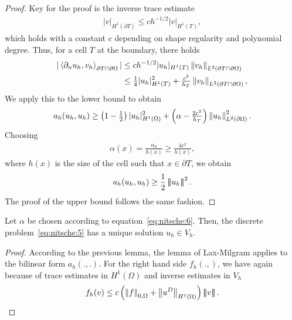 \begin{proof}
  Key for the proof is the inverse trace estimate
  \begin{gather*}
    |v|_{H^1(\partial T)} \le c h^{-1/2} |v|_{H^1(T)},
  \end{gather*}
  which holds with a constant $c$ depending on shape regularity and
  polynomial degree. Thus, for a cell $T$ at the boundary, there holds
  \begin{align*}
    |\forme(\partial_n u_h, v_h)_{\partial T \cap \partial\Omega}|
    & \le c h^{-1/2} |u_h|_{H^1(T)} \norm{v_h}_{L^2(\partial T \cap \partial\Omega)}
    \\
    &\le \tfrac{1}{4} |u_h|_{H^1(T)}^2
    + \tfrac{c^2}{h_T}\norm{v_h}_{L^2(\partial T \cap \partial\Omega)},
  \end{align*}
  We apply this to the lower bound to obtain
  \begin{gather*}
    a_h(u_h, u_h) \ge \left(1-\tfrac{1}{2}\right)
    |u_h|_{H^1(\Omega)}^2
    + \left(\alpha - \tfrac{2c^2}{h_T}\right)
    \left\|u_h\right\|_{L^2(\partial\Omega)}^2.
  \end{gather*}
  Choosing
  \begin{gather}
    \label{eq:nitsche:6}
    \alpha(x) = \frac{\alpha_0}{h(x)} \ge \frac{4c^2}{h(x)}, 
  \end{gather}
  where $h(x)$ is the size of the
  cell such that $x\in\partial T$, we obtain
  \begin{gather*}
    a_h(u_h, u_h) \ge \frac12 \left|\!\left|\!\left|u_h\right|\!\right|\!\right|^2.
  \end{gather*}
  The proof of the upper bound follows the same fashion.
\end{proof}

\begin{corollary}
  Let $\alpha$ be chosen according to
  equation~\eqref{eq:nitsche:6}. Then, the discrete
  problem~\eqref{eq:nitsche:5} has a unique solution $u_h\in V_h$.
\end{corollary}

\begin{proof}
  According to the previous lemma, the lemma of Lax-Milgram applies to
  the bilinear form $a_h(.,.)$. For the right hand side $f_h(.,)$, we
  have again because of trace estimates in $H^1(\Omega)$ and inverse
  estimates in $V_h$
  \begin{gather*}
    f_h(v) \le c \left(\left\|f\right\|_{0,\Omega}+
      \left\|u^D\right\|_{H^1(\Omega)}\right)\left|\!\left|\!\left|v\right|\!\right|\!\right|.
  \end{gather*}
\end{proof}

